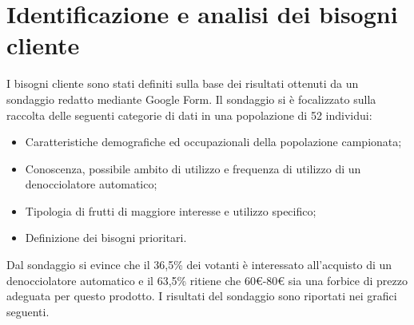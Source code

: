 \documentclass[12pt,a4paper,twoside]{report}  %
\begin{document}
\section{Identificazione e analisi dei bisogni cliente}
\label{sec:identificazioneBisogniCliente}
I bisogni cliente sono stati definiti sulla base dei risultati ottenuti da un sondaggio redatto mediante Google Form. Il sondaggio si è focalizzato sulla raccolta delle seguenti categorie di dati in una popolazione di 52 individui:
\begin{itemize}
\item Caratteristiche demografiche ed occupazionali della popolazione campionata;
\item Conoscenza, possibile ambito di utilizzo e frequenza di utilizzo di un denocciolatore automatico;
\item Tipologia di frutti di maggiore interesse e utilizzo specifico;
\item Definizione dei bisogni prioritari.
\end{itemize}
Dal sondaggio si evince che il 36,5\% dei votanti è interessato all'acquisto di un denocciolatore automatico e il 63,5\% ritiene che 60€-80€ sia una forbice di prezzo adeguata per questo prodotto.
I risultati del sondaggio sono riportati nei grafici seguenti.
\end{document}
